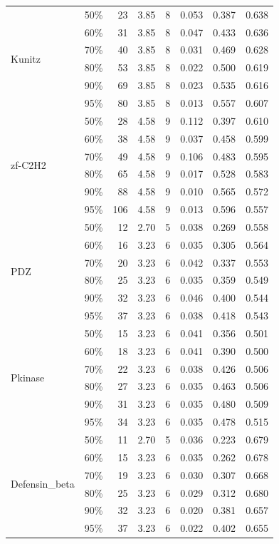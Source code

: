 \begin{table}[p]
\begin{tabular}{@{}llrrrrcc@{}}
\midrule
\multirow{6}{*}{Kunitz}
 & 50\% &  23 & 3.85 &  8 & 0.053 & 0.387 & 0.638 \\
 & 60\% &  31 & 3.85 &  8 & 0.047 & 0.433 & 0.636 \\
 & 70\% &  40 & 3.85 &  8 & 0.031 & 0.469 & 0.628 \\
\cmidrule{2-8}
 & 80\% &  53 & 3.85 &  8 & 0.022 & 0.500 & 0.619 \\
 & 90\% &  69 & 3.85 &  8 & 0.023 & 0.535 & 0.616 \\
 & 95\% &  80 & 3.85 &  8 & 0.013 & 0.557 & 0.607 \\
\midrule
\multirow{6}{*}{zf-C2H2}
 & 50\% &  28 & 4.58 &  9 & 0.112 & 0.397 & 0.610 \\
 & 60\% &  38 & 4.58 &  9 & 0.037 & 0.458 & 0.599 \\
 & 70\% &  49 & 4.58 &  9 & 0.106 & 0.483 & 0.595 \\
\cmidrule{2-8}
 & 80\% &  65 & 4.58 &  9 & 0.017 & 0.528 & 0.583 \\
 & 90\% &  88 & 4.58 &  9 & 0.010 & 0.565 & 0.572 \\
 & 95\% & 106 & 4.58 &  9 & 0.013 & 0.596 & 0.557 \\
\midrule
\multirow{6}{*}{PDZ}
 & 50\% &  12 & 2.70 &  5 & 0.038 & 0.269 & 0.558 \\
 & 60\% &  16 & 3.23 &  6 & 0.035 & 0.305 & 0.564 \\
 & 70\% &  20 & 3.23 &  6 & 0.042 & 0.337 & 0.553 \\
\cmidrule{2-8}
 & 80\% &  25 & 3.23 &  6 & 0.035 & 0.359 & 0.549 \\
 & 90\% &  32 & 3.23 &  6 & 0.046 & 0.400 & 0.544 \\
 & 95\% &  37 & 3.23 &  6 & 0.038 & 0.418 & 0.543 \\
\midrule
\multirow{6}{*}{Pkinase}
 & 50\% &  15 & 3.23 &  6 & 0.041 & 0.356 & 0.501 \\
 & 60\% &  18 & 3.23 &  6 & 0.041 & 0.390 & 0.500 \\
 & 70\% &  22 & 3.23 &  6 & 0.038 & 0.426 & 0.506 \\
\cmidrule{2-8}
 & 80\% &  27 & 3.23 &  6 & 0.035 & 0.463 & 0.506 \\
 & 90\% &  31 & 3.23 &  6 & 0.035 & 0.480 & 0.509 \\
 & 95\% &  34 & 3.23 &  6 & 0.035 & 0.478 & 0.515 \\
\midrule
\multirow{6}{*}{Defensin\_beta}
 & 50\% &  11 & 2.70 &  5 & 0.036 & 0.223 & 0.679 \\
 & 60\% &  15 & 3.23 &  6 & 0.035 & 0.262 & 0.678 \\
 & 70\% &  19 & 3.23 &  6 & 0.030 & 0.307 & 0.668 \\
\cmidrule{2-8}
 & 80\% &  25 & 3.23 &  6 & 0.029 & 0.312 & 0.680 \\
 & 90\% &  32 & 3.23 &  6 & 0.020 & 0.381 & 0.657 \\
 & 95\% &  37 & 3.23 &  6 & 0.022 & 0.402 & 0.655 \\
\bottomrule
\end{tabular}
\end{table}

